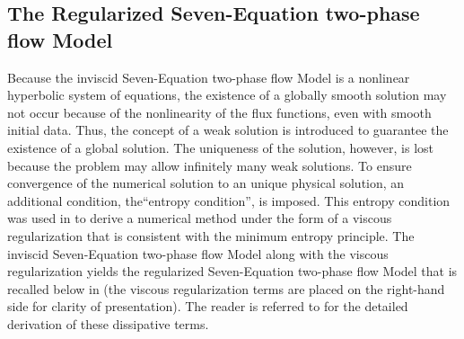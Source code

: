 \documentclass[preprint,10pt]{elsarticle}
\begin{document}
\subsection{The Regularized Seven-Equation two-phase flow Model}\label{sec:ref-sem}
%
Because the inviscid Seven-Equation two-phase flow Model is a nonlinear hyperbolic system of equations, the existence of a 
globally smooth solution may not occur because of the nonlinearity of the flux functions, even with smooth initial data. Thus, the concept of a weak
solution is introduced to guarantee the existence of a global solution. The uniqueness of the solution, however, is lost because the problem may
allow infinitely many weak solutions. To ensure convergence of the numerical solution to an unique physical solution, an additional condition, 
the``entropy condition'', is imposed. This entropy condition was used 
in \cite{Marco_paper_sem} to derive a numerical method under the form of a viscous regularization that is consistent with the minimum entropy principle. 
The inviscid Seven-Equation two-phase flow Model along with the viscous 
regularization yields the regularized Seven-Equation two-phase flow Model that is recalled below in  
(the viscous regularization terms are placed on the right-hand side for clarity of presentation). The reader 
is referred to \cite{Marco_paper_sem} for the detailed derivation of these dissipative terms.
%
\end{document}
